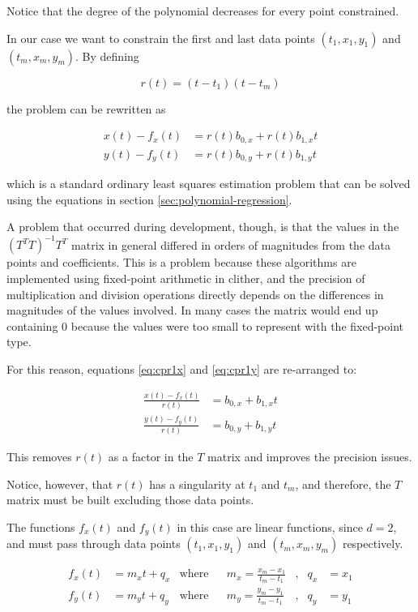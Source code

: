 Notice that the degree of the polynomial decreases for every point constrained.

In our case we want to constrain the first and last data points $(t_1,x_1,y_1)$ and $(t_m,x_m,y_m)$. By defining

\begin{equation}
    r(t) = (t-t_1)(t-t_m)
\end{equation}

the problem can be rewritten as

\begin{align}
    x(t) - f_x(t) &= r(t) b_{0,x} + r(t) b_{1,x} t \label{eq:cpr1x} \\
    y(t) - f_y(t) &= r(t) b_{0,y} + r(t) b_{1,y} t \label{eq:cpr1y}
\end{align}

which is a standard ordinary least squares estimation problem that can be solved using the equations in section \ref{sec:polynomial-regression}.

A problem that occurred during development, though, is that the values in the $(T^T T)^{-1} T^T$ matrix in general differed in orders of magnitudes from the data points and coefficients. This is a problem because these algorithms are implemented using fixed-point arithmetic in clither, and the precision of multiplication and division operations directly depends on the differences in magnitudes of the values involved. In many cases the matrix would end up containing $0$ because the values were too small to represent with the fixed-point type.

For this reason, equations \ref{eq:cpr1x} and \ref{eq:cpr1y} are re-arranged to:

\begin{align}
    \frac{x(t) - f_x(t)}{r(t)} &= b_{0,x} + b_{1,x} t \\
    \frac{y(t) - f_y(t)}{r(t)} &= b_{0,y} + b_{1,y} t
\end{align}

This removes $r(t)$ as a factor in the $T$ matrix and improves the precision issues.

Notice, however, that $r(t)$ has a singularity at $t_1$ and $t_m$, and therefore, the $T$ matrix must be built excluding those data points.

The functions $f_x(t)$ and $f_y(t)$ in this case are linear functions, since $d=2$, and must pass through data points $(t_1,x_1,y_1)$ and $(t_m,x_m,y_m)$ respectively.

\begin{align}
    f_x(t) &= m_x t + q_x & \text{where} && m_x = \frac{x_m-x_1}{t_m-t_1} &,& q_x &= x_1 \\
    f_y(t) &= m_y t + q_y & \text{where} && m_y = \frac{y_m-y_1}{t_m-t_1} &,& q_y &= y_1
\end{align}

